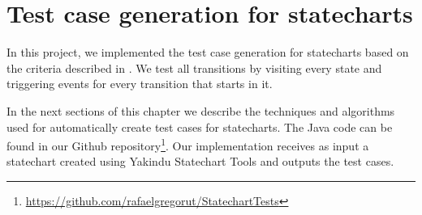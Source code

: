 \chapter{Test case generation for statecharts}
\label{cap:testgen}


%

%

In this project, we implemented the test case generation for statecharts based on the criteria described in \cite{bogdanov}. We test all transitions by visiting every state and triggering events for every transition that starts in it. 

In the next sections of this chapter we describe the techniques and algorithms used for automatically create test cases for statecharts. The Java code can be found in our Github repository\footnote{\url{https://github.com/rafaelgregorut/StatechartTests}}. Our implementation receives as input a statechart created using Yakindu Statechart Tools \cite{Yakindu} and outputs the test cases.




